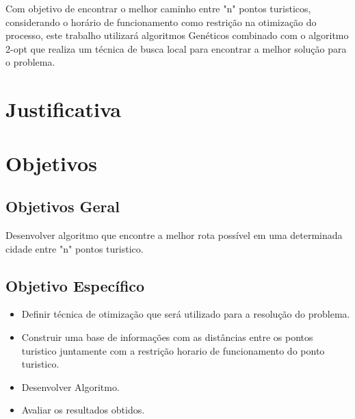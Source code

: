\documentclass[
	12pt,				%
	openright,			%
	twoside,			%
	a4paper,			%
	chapter=TITLE,		%
	section=TITLE,		%
	english,			%
	french,				%
	spanish,			%
	brazil				%
	]{abntex2}
\begin{document}
Com objetivo de encontrar o melhor caminho entre "n" pontos turisticos, considerando o horário de funcionamento como restrição na otimização do processo, este trabalho utilizará algoritmos Genéticos combinado com o algoritmo 2-opt que realiza um técnica de busca local para encontrar a melhor solução para o problema.



%


\chapter{Justificativa}

\chapter{Objetivos}
\section{Objetivos Geral}
Desenvolver algoritmo que encontre a melhor rota possível em uma determinada cidade entre "n" pontos
turistico.
\section{Objetivo Específico}
\begin{itemize}
\item Definir técnica de otimização que será utilizado para a resolução do problema.
\item Construir uma base de informações com as distâncias entre os pontos turistico juntamente com a restrição horario de funcionamento do ponto turistico.
\item Desenvolver Algoritmo.
\item Avaliar os resultados obtidos.
\end{itemize}
\end{document}
